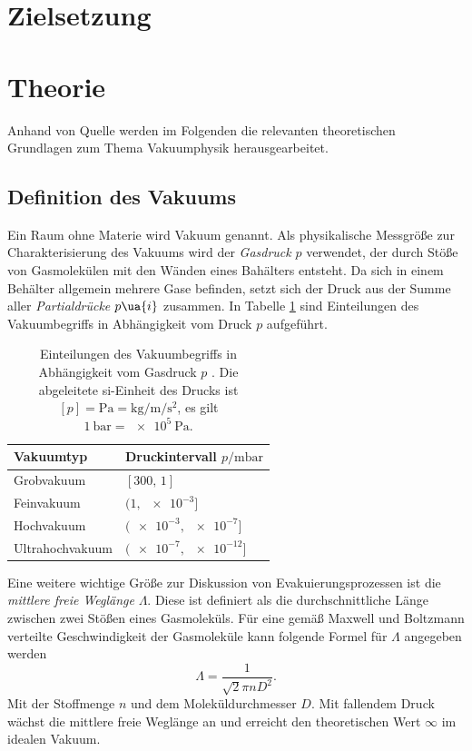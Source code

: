 \setcounter{page}{1}
\section*{Zielsetzung}

\section{Theorie}
Anhand von Quelle \cite{dem1} werden im Folgenden die relevanten theoretischen Grundlagen zum Thema
Vakuumphysik herausgearbeitet.
\subsection{Definition des Vakuums}
Ein Raum ohne Materie wird Vakuum genannt. Als physikalische Messgröße zur Charakterisierung
des Vakuums wird der \emph{Gasdruck} $p$ verwendet, der durch Stöße von Gasmolekülen mit den Wänden eines Bahälters
entsteht. Da sich in einem Behälter allgemein mehrere Gase befinden, setzt sich der Druck aus der Summe aller
\emph{Partialdrücke} $p\ua{i}$ zusammen.
In Tabelle \ref{tab: vakuumbegriffe} sind Einteilungen des Vakuumbegriffs in Abhängigkeit vom
Druck $p$ aufgeführt.
\begin{table}
  \centering
  \caption{Einteilungen des Vakuumbegriffs in Abhängigkeit vom Gasdruck $p$ \cite{dem1}. Die abgeleitete si-Einheit des Drucks ist
  $[p] = \si{\pascal} = \si{\kilogram \per\meter\per \second\squared}$, es gilt $\SI{1}{\bar} = \SI{e5}{\pascal}$.}
  \label{tab: vakuumbegriffe}
  \begin{tabular}{l l}
    \toprule
    {Vakuumtyp} & {Druckintervall $p/\si{\milli\bar}$} \\
    \midrule
    Grobvakuum &  $[\num{300},\,\num{1}]$ \\
    Feinvakuum &  $(\num{1},\,\num{e-3}]$ \\
    Hochvakuum &  $(\num{e-3},\,\num{e-7}]$ \\
    Ultrahochvakuum &  $(\num{e-7},\,\num{e-12}]$ \\
    \bottomrule
  \end{tabular}
\end{table}
\FloatBarrier Eine weitere wichtige Größe zur Diskussion von Evakuierungsprozessen ist die \emph{mittlere freie
Weglänge} $\Lambda$. Diese ist definiert als die durchschnittliche Länge zwischen zwei Stößen
eines Gasmoleküls. Für eine gemäß Maxwell und Boltzmann verteilte Geschwindigkeit der Gasmoleküle kann
folgende Formel für $\Lambda$ angegeben werden
\begin{equation}
  \Lambda = \frac{1}{\sqrt{2}\pi n D^2}.
\end{equation}
Mit der Stoffmenge $n$ und dem Moleküldurchmesser $D$. Mit fallendem Druck wächst die mittlere freie
Weglänge an und erreicht den theoretischen Wert $\infty$ im idealen Vakuum.

